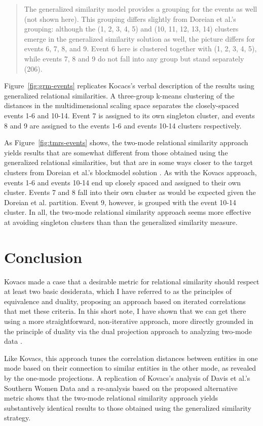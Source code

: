 \documentclass[a4paper,fleqn]{cas-sc}
\begin{document}
\begin{quote}
The generalized similarity model provides a grouping for the events as well (not shown here). This grouping differs slightly from Doreian et al.'s \citeyearpar{doreian2004} grouping: although the (1, 2, 3, 4, 5) and (10, 11, 12, 13, 14) clusters emerge in the generalized similarity solution as well, the picture differs for events 6, 7, 8, and 9. Event 6 here is clustered together with (1, 2, 3, 4, 5), while events 7, 8 and 9 do not fall into any group but stand separately  (206). 
\end{quote}

Figure~\ref{fig:grm-events} replicates Kocacs's verbal description of the results using generalized relational similarities. A three-group k-means clustering of the distances in the multidimensional scaling space separates the closely-spaced events 1-6 and 10-14. Event 7 is assigned to its own singleton cluster, and events 8 and 9 are assigned to the events 1-6 and events 10-14 clusters respectively. 

As Figure~\ref{fig:tmrs-events} shows, the two-mode relational similarity approach yields results that are somewhat different from those obtained using the generalized relational similarities, but that are in some ways closer to the target clusters from Doreian et al.'s blockmodel solution \citeyearpar{doreian2004}. As with the Kovacs approach, events 1-6 and events 10-14 end up closely spaced and assigned to their own cluster. Events 7 and 8 fall into their own cluster as would be expected given the Doreian et al. partition. Event 9, however, is grouped with the event 10-14 cluster. In all, the two-mode relational similarity approach seems more effective at avoiding singleton clusters than than the generalized similarity measure. 

\section{Conclusion}
Kovacs \citeyearpar{kovacs2010} made a case that a desirable metric for relational similarity should respect at least two basic desiderata, which I have referred to as the principles of equivalence and duality, proposing an approach based on iterated correlations that met these criteria. In this short note, I have shown that we can get there using a more straightforward, non-iterative approach, more directly grounded in the principle of duality via the dual projection approach to analyzing two-mode data \citep{everett2013}. 

Like Kovacs, this approach tunes the correlation distances between entities in one mode based on their connection to similar entities in the other mode, as revealed by the one-mode projections. A replication of Kovacs's analysis of Davis et al.'s \citeyearpar{davis1941} Southern Women Data and a re-analysis based on the proposed alternative metric shows that the two-mode relational similarity approach yields substantively identical results to those obtained using the generalized similarity strategy. 

%


\end{document}

